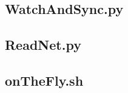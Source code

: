 \documentclass[12pt]{article}
\begin{document}
\subsection{WatchAndSync.py}
\label{sec:WatchAndSync}


\subsection{ReadNet.py}
\label{sec:ReadNet}


\subsection{onTheFly.sh}
\label{sec:onTheFly}

\end{document}
